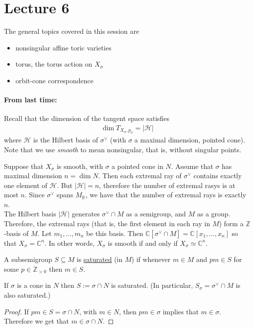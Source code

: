 \documentclass[a4paper,12pt]{amsart}
\newcommand{\ZZ}{\mathbb{Z}}
\newcommand{\RR}{\mathbb{R}}
\newcommand{\CC}{\mathbb{C}}
\begin{document}
\newpage
\section{Lecture 6}

The general topics covered in this session are
\begin{itemize}
\item nonsingular affine toric varieties
\item torus, the torus action on $X_\sigma$
\item orbit-cone correspondence 
\end{itemize}

\paragraph{From last time:}
Recall that the dimension of the tangent space satisfies
\begin{align*}
	\dim T_{X_\sigma, p_\sigma} = | \mathcal{H} |
\end{align*}
where $\mathcal{H}$ is the Hilbert basis of $\sigma^\vee$ (with $\sigma$ a maximal dimension, pointed cone). Note that we use \textit{smooth} to mean nonsingular, that is, without singular points. 

Suppose that $X_\sigma$ is smooth, with $\sigma$ a pointed cone in $N$. Assume that $\sigma$ has maximal dimension $n = \dim N$. Then each extremal ray of $\sigma^\vee$ contains exactly one element of $\mathcal{H}$.	But $|\mathcal{H}| = n$, therefore the number of extremal rasys is at most $n$. Since $\sigma^\vee$ spans $M_\RR$, we have that the number of extremal rays is exactly $n$.  \\

The Hilbert basis $|\mathcal{H}|$ generates $\sigma^\vee \cap M$ as a semigroup, and $M$ as a group. Therefore, the extremal rays (that is, the first element in each ray in $M$) form a $\ZZ$-basis of $M$. Let $m_1, ..., m_n$ be this basis. Then $\CC[\sigma^\vee \cap M] = \CC[x_1, ..., x_n]$ so that $X_\sigma = \CC^n$. In other words, $X_\sigma$ is smooth if and only if $X_\sigma \simeq \CC^n$.

\begin{Def}
A subsemigroup $S \subseteq M$ is \underline{saturated} (in $M$) if whenever $m \in M$ and $pm \in S$ for some $p \in \ZZ_{> 0}$ then $m \in S$.
\end{Def}


\begin{Lemma}\label{lemma1}
	If $\sigma$ is a cone in $N$ then $S := \sigma \cap N$ is saturated. (In particular, $S_\sigma = \sigma^\vee \cap M$ is also saturated.)
\end{Lemma}
\begin{proof}
	If $pm \in S = \sigma \cap N$, with $m \in N$, then $pm \in \sigma$ implies that $m \in \sigma$. Therefore we get that $m \in \sigma \cap N$.
\end{proof}
\end{document}
